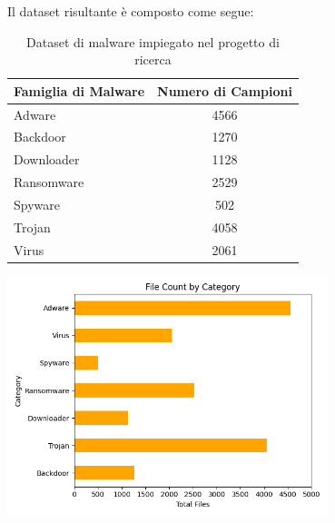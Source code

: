 \vspace{.5cm}
Il dataset risultante è composto come segue:
\begin{table}[h]
    \centering
    \begin{tabular}{|l|c|}
        \hline
        \textbf{Famiglia di Malware} & \textbf{Numero di Campioni} \\
        \hline
        Adware & 4566 \\
        \hline
        Backdoor & 1270 \\
        \hline
        Downloader & 1128 \\
        \hline
        Ransomware & 2529 \\
        \hline
        Spyware & 502 \\
        \hline
        Trojan & 4058 \\
        \hline
        Virus & 2061 \\
        \hline
    \end{tabular}
    \vspace{.2cm}
    \caption{Dataset di malware impiegato nel progetto di ricerca}
\end{table}

\begin{center}
	\includegraphics[width=0.7\textwidth]{images/total_families.png}
\end{center}

\newpage

